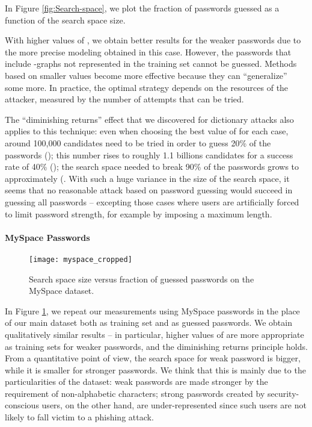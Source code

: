 \documentclass[a4paper,twocolumn]{article}
\begin{document}
In Figure \ref{fig:Search-space}, we plot the fraction of passwords
guessed as a function of the search space size.

With higher values of , we obtain better results for the weaker
passwords due to the more precise modeling obtained in this case.
However, the passwords that include -graphs not represented in
the training set cannot be guessed. Methods based on smaller 
values become more effective because they can {}``generalize'' some
more. In practice, the optimal strategy depends on the resources of
the attacker, measured by the number of attempts that can be tried.

The {}``diminishing returns'' effect that we discovered for dictionary
attacks also applies to this technique: even when choosing the best
value of  for each case, around 100,000 candidates need to be
tried in order to guess 20\% of the passwords (); this number
rises to roughly 1.1 billions candidates for a success rate of 40\%
(); the search space needed to break 90\% of the passwords grows
to approximately  (. With such a huge variance
in the size of the search space, it seems that no reasonable attack
based on password guessing would succeed in guessing all passwords
-- excepting those cases where users are artificially forced to limit
password strength, for example by imposing a maximum length.


\paragraph{MySpace Passwords}

\begin{figure}
\begin{centering}
\texttt{[image: myspace\_cropped]}
\par\end{centering}

\caption{\label{fig:Search-space-1}Search space size versus fraction of guessed
passwords on the MySpace dataset.}

\end{figure}


In Figure \ref{fig:Search-space-1}, we repeat our measurements using
MySpace passwords in the place of our main dataset both as training
set and as guessed passwords. We obtain qualitatively similar results
-- in particular, higher values of  are more appropriate as training
sets for weaker passwords, and the diminishing returns principle holds.
From a quantitative point of view, the search space for weak password
is bigger, while it is smaller for stronger passwords. We think that
this is mainly due to the particularities of the dataset: weak passwords
are made stronger by the requirement of non-alphabetic characters;
strong passwords created by security-conscious users, on the other
hand, are under-represented since such users are not likely to fall
victim to a phishing attack.
\end{document}

